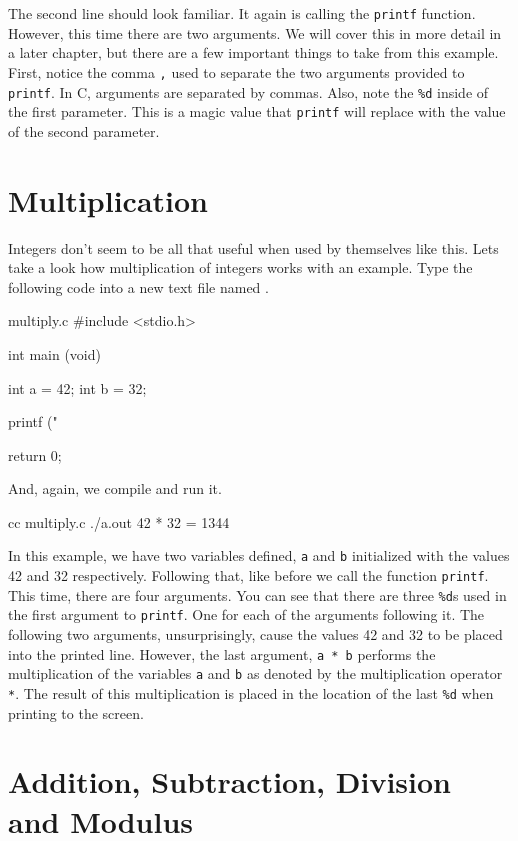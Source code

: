 The second line should look familiar. It again is calling the \verb|printf|
function. However, this time there are two arguments. We will cover this in
more detail in a later chapter, but there are a few important things to take
from this example. First, notice the comma \verb|,| used to separate the
two arguments provided to \verb|printf|. In C, arguments are separated by
commas. Also, note the \verb|%d| inside of the first parameter. This is a
magic value that \verb|printf| will replace with the value of the second
parameter.

\section{Multiplication}

Integers don't seem to be all that useful when used by themselves like this.
Lets take a look how multiplication of integers works with an example. Type
the following code into a new text file named .

\begin{code}{multiply.c}
#include <stdio.h>

int
main (void)
{
    int a = 42;
    int b = 32;

    printf ("%

    return 0;
}
\end{code}

And, again, we compile and run it.

\begin{Terminal}
cc multiply.c
./a.out
42 * 32 = 1344
\end{Terminal}

In this example, we have two variables defined, \verb|a| and \verb|b|
initialized with the values 42 and 32 respectively. Following that, like before
we call the function \verb|printf|. This time, there are four arguments. You can
see that there are three \verb|%d|s used in the first argument to \verb|printf|.
One for each of the arguments following it. The following two arguments,
unsurprisingly, cause the values 42 and 32 to be placed into the printed line.
However, the last argument, \verb|a * b| performs the multiplication of the
variables \verb|a| and \verb|b| as denoted by the multiplication operator
\verb|*|. The result of this multiplication is placed in the location of the
last \verb|%d| when printing to the screen.

\section{Addition, Subtraction, Division and Modulus}

